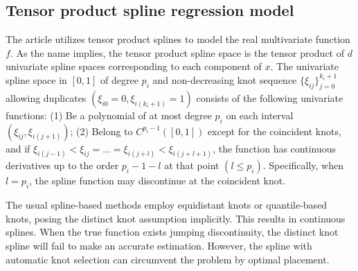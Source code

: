 \subsection{Tensor product spline regression model}

The article utilizes tensor product splines to model the real multivariate function $f$. As the name implies, the tensor product spline space is the tensor product of $d$ univariate spline spaces corresponding to each component of $x$. The univariate spline space in $[0,1]$ of degree $p_i$ and non-decreasing knot sequence $\{\xi_{ij}\}_{j=0}^{k_i+1}$ allowing duplicates $(\xi_{i0}=0,\xi_{i(k_i+1)}=1)$ consists of the following univariate functions: (1) Be a polynomial of at most degree $p_i$ on each interval $(\xi_{ij},\xi_{i(j+1)})$; (2) Belong to $C^{p_i-1}([0,1])$ except for the coincident knots, and if $\xi_{i(j-1)}<\xi_{ij}=\ldots=\xi_{i(j+l)}<\xi_{i(j+l+1)}$, the function has continuous derivatives up to the order $p_i-1-l$ at that point $(l\leq p_i)$. Specifically, when $l=p_i$, the spline function may discontinue at the coincident knot.

\begin{remark}
    The usual spline-based methods employ equidistant knots or quantile-based knots, posing the distinct knot assumption implicitly. This results in continuous splines. When the true function exists jumping discontinuity, the distinct knot spline will fail to make an accurate estimation. However, the spline with automatic knot selection can circumvent the problem by optimal placement.
\end{remark}

